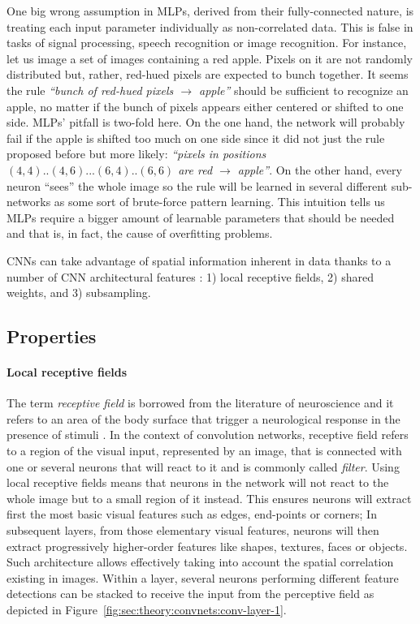 One big wrong assumption in MLPs, derived from their fully-connected nature, is treating each input parameter individually as non-correlated data.
This is false in tasks of signal processing, speech recognition or image recognition.
For instance, let us image a set of images containing a red apple.
Pixels on it are not randomly distributed but, rather, red-hued pixels are expected to bunch together.
It seems the rule \emph{``bunch of red-hued pixels $\rightarrow$ apple''} should be sufficient to recognize an apple, no matter if the bunch of pixels appears either centered or shifted to one side.
MLPs' pitfall is two-fold here.
On the one hand, the network will probably fail if the apple is shifted too much on one side since it did not just the rule proposed before but more likely: \emph{``pixels in positions $(4, 4)..(4, 6)...(6, 4)..(6, 6)$ are red $\rightarrow$ apple''}.
On the other hand, every neuron ``sees'' the whole image so the rule will be learned in several different sub-networks as some sort of brute-force pattern learning.
This intuition tells us MLPs require a bigger amount of learnable parameters that should be needed and that is, in fact, the cause of overfitting problems.

CNNs can take advantage of spatial information inherent in data thanks to a number of CNN architectural features \cite{LeCun1998}: 1) local receptive fields, 2) shared weights, and 3) subsampling.


\subsection{Properties}
\label{sub:concepts:convnets:properties}

\paragraph{Local receptive fields}
The term \emph{receptive field} is borrowed from the literature of neuroscience and it refers to an area of the body surface that trigger a neurological response in the presence of stimuli \cite{Sherrington1906,Alonso2008}.
In the context of convolution networks, receptive field refers to a region of the visual input, represented by an image, that is connected with one or several neurons that will react to it and is commonly called \emph{filter}.
Using local receptive fields means that neurons in the network will not react to the whole image but to a small region of it instead.
This ensures neurons will extract first the most basic visual features such as edges, end-points or corners;
In subsequent layers, from those elementary visual features, neurons will then extract progressively higher-order features like shapes, textures, faces or objects.
Such architecture allows effectively taking into account the spatial correlation existing in images.
Within a layer, several neurons performing different feature detections can be stacked to receive the input from the perceptive field as depicted in Figure~\ref{fig:sec:theory:convnets:conv-layer-1}.

